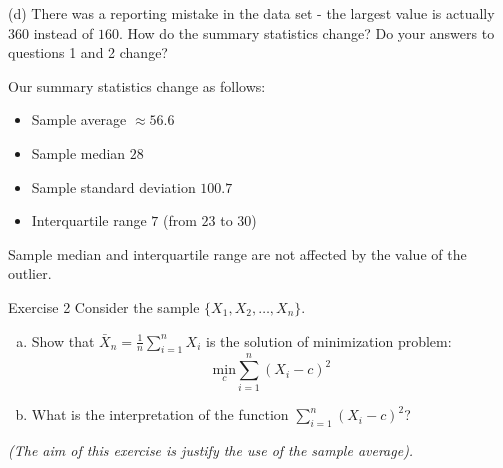 \documentclass[
  11pt,
  ignorenonframetext,
]{beamer}
\begin{document}
\begin{frame}{(d) There was a reporting mistake in the data set - the
largest value is actually \(360\) instead of \(160\). How do the summary
statistics change? Do your answers to questions 1 and 2 change?}
\protect\hypertarget{d-there-was-a-reporting-mistake-in-the-data-set---the-largest-value-is-actually-360-instead-of-160.-how-do-the-summary-statistics-change-do-your-answers-to-questions-1-and-2-change}{}
\pause

Our summary statistics change as follows:

\begin{itemize}
\item
  Sample average \(\approx 56.6\)
\item
  Sample median \(28\)
\item
  Sample standard deviation \(100.7\)
\item
  Interquartile range \(7\) (from \(23\) to \(30\))
\end{itemize}

Sample median and interquartile range are not affected by the value of
the outlier.
\end{frame}

\begin{frame}{Exercise 2}
\protect\hypertarget{exercise-2}{}
Consider the sample \(\{X_1, X_2, \ldots, X_n\}\).

\begin{enumerate}
[a.]
\item
  Show that \(\bar{X}_n = \frac{1}{n} \sum_{i=1}^n X_i\) is the solution
  of minimization problem: \[
  \tag{1}
  \underset{c}{\text{min}} \sum_{i=1}^{n} \left(X_i - c\right)^2
  \]
\item
  What is the interpretation of the function
  \(\sum_{i=1}^{n} \left(X_i - c\right)^2\)?
\end{enumerate}

\emph{(The aim of this exercise is justify the use of the sample
average).}
\end{frame}
\end{document}
